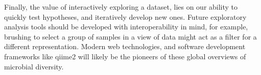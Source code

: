 Finally, the value of interactively exploring a dataset, lies on our ability to
quickly test hypotheses, and iteratively develop new ones. Future exploratory
analysis tools should be developed with interoperability in mind, for example,
brushing to select a group of samples in a view of data might act as a filter
for a different representation. Modern web technologies, and software
development frameworks like \gls{qiime}2 will likely be the pioneers of these
global overviews of microbial diversity.
